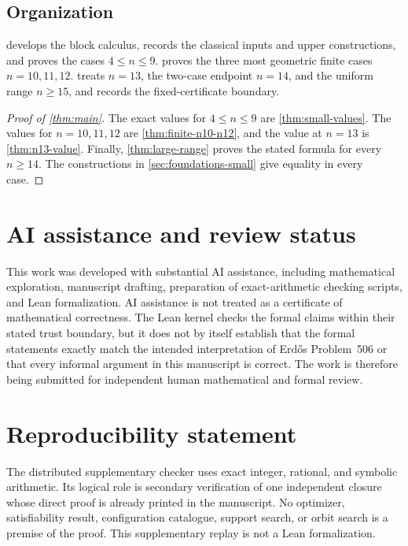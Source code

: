 \documentclass[11pt]{article}
\theoremstyle{definition}
\theoremstyle{remark}
\begin{document}
\subsection*{Organization}

 develops the block calculus, records the
classical inputs and upper constructions, and proves the cases
\(4\le n\le9\).   proves the three most geometric
finite cases \(n=10,11,12\).   treats \(n=13\), the
two-case endpoint \(n=14\), and the uniform range \(n\ge15\), and records
the fixed-certificate boundary.





\begin{proof}[Proof of \cref{thm:main}]
The exact values for \(4\le n\le9\) are
\cref{thm:small-values}.  The values for \(n=10,11,12\) are
\cref{thm:finite-n10-n12}, and the value at \(n=13\) is
\cref{thm:n13-value}.  Finally, \cref{thm:large-range} proves the stated
formula for every \(n\ge14\).  The constructions in
\cref{sec:foundations-small} give equality in every case.
\end{proof}

\section*{AI assistance and review status}

This work was developed with substantial AI assistance, including
mathematical exploration, manuscript drafting, preparation of exact-arithmetic
checking scripts, and Lean formalization.  AI assistance is not treated as a
certificate of mathematical correctness.  The Lean kernel checks the formal
claims within their stated trust boundary, but it does not by itself establish
that the formal statements exactly match the intended interpretation of
Erd\H{o}s Problem~506 or that every informal argument in this manuscript is
correct.  The work is therefore being submitted for independent human
mathematical and formal review.

\section*{Reproducibility statement}

The distributed supplementary checker uses exact integer, rational, and
symbolic arithmetic.  Its logical role is secondary verification of one
independent closure whose direct proof is already printed in the manuscript.
No optimizer, satisfiability result,
configuration catalogue, support search, or orbit search is a premise of
the proof.  This supplementary replay is not a Lean formalization.



\end{document}
